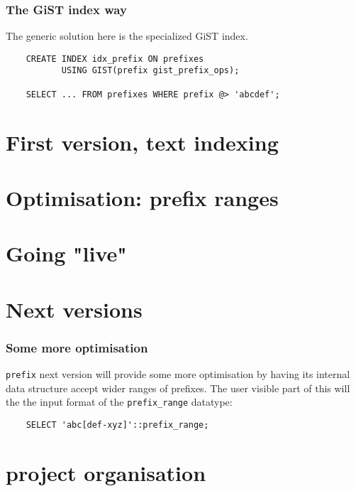 \documentclass{beamer}
\begin{document}
\begin{frame}[fragile]
  \frametitle{The GiST index way}

  The generic solution here is the specialized \alert{GiST} index.

  \begin{example}
  \begin{verbatim}
    CREATE INDEX idx_prefix ON prefixes
           USING GIST(prefix gist_prefix_ops);

    SELECT ... FROM prefixes WHERE prefix @> 'abcdef';
  \end{verbatim}
  \end{example}
\end{frame}


\section{First version, text indexing}


\section{Optimisation: prefix ranges}


\section{Going "live"}


\section{Next versions}

\begin{frame}[fragile]
  \frametitle{Some more optimisation}
  
  \texttt{prefix} next version will provide some more optimisation by having
  its internal data structure accept wider ranges of prefixes.  The user
  visible part of this will the the input format of the
  \texttt{prefix\_range} datatype:
  
  \begin{example}
  \begin{verbatim}
    SELECT 'abc[def-xyz]'::prefix_range;
  \end{verbatim}
  \end{example}
\end{frame}

\section{project organisation}

\end{document}
